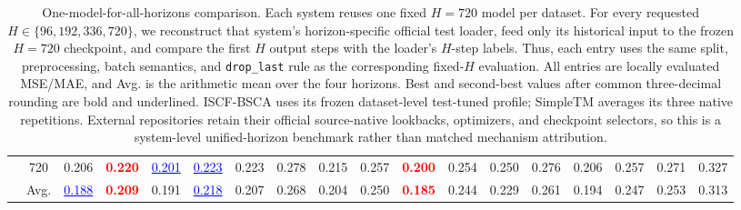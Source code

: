 \begin{table}[t]
{\begin{tabular}{cc|cc|cc|cc|cc|cc|cc|cc|cc}
 & 720 & 0.206 & \textcolor{red}{\textbf{0.220}} & \textcolor{blue}{\underline{0.201}} & \textcolor{blue}{\underline{0.223}} & 0.223 & 0.278 & 0.215 & 0.257 & \textcolor{red}{\textbf{0.200}} & 0.254 & 0.250 & 0.276 & 0.206 & 0.257 & 0.271 & 0.327 \\
\cmidrule(lr){2-18}
 & Avg. & \textcolor{blue}{\underline{0.188}} & \textcolor{red}{\textbf{0.209}} & 0.191 & \textcolor{blue}{\underline{0.218}} & 0.207 & 0.268 & 0.204 & 0.250 & \textcolor{red}{\textbf{0.185}} & 0.244 & 0.229 & 0.261 & 0.194 & 0.247 & 0.253 & 0.313 \\
\bottomrule
\end{tabular}%
}
\caption{One-model-for-all-horizons comparison. Each system reuses one fixed $H=720$ model per dataset. For every requested $H\in\{96,192,336,720\}$, we reconstruct that system's horizon-specific official test loader, feed only its historical input to the frozen $H=720$ checkpoint, and compare the first $H$ output steps with the loader's $H$-step labels. Thus, each entry uses the same split, preprocessing, batch semantics, and \texttt{drop\_last} rule as the corresponding fixed-$H$ evaluation. All entries are locally evaluated MSE/MAE, and Avg. is the arithmetic mean over the four horizons. Best and second-best values after common three-decimal rounding are bold and underlined. ISCF-BSCA uses its frozen dataset-level test-tuned profile; SimpleTM averages its three native repetitions. External repositories retain their official source-native lookbacks, optimizers, and checkpoint selectors, so this is a system-level unified-horizon benchmark rather than matched mechanism attribution.}
\label{tab:main_ii_h720_horizon_loader}
\end{table}
